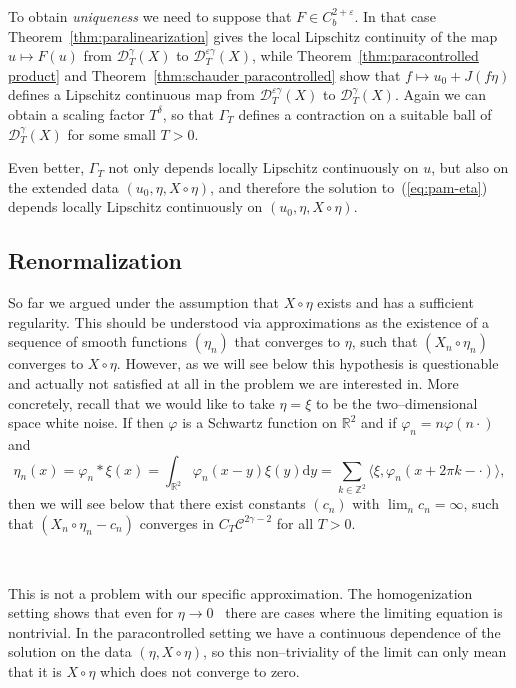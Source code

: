 \documentclass[a4paper,11pt]{article}
\newcommand{\cdummy}{\cdot}
\newcommand{\comma}{{,}}
\newcommand{\mathd}{\mathrm{d}}
\newcommand{\tmtextit}[1]{{\itshape{#1}}}
\newcommand{\CC}{\mathscr{C}}
\newcommand{\CD}{\mathscr{D}}
\newcommand{\reso}{\,\mathord{\circ}\,}
\begin{document}
To obtain \tmtextit{uniqueness} we need to suppose that $F \in C^{2 +
\varepsilon}_b$. In that case Theorem~\ref{thm:paralinearization} gives the
local Lipschitz continuity of the map $u \mapsto F (u)$ from $\CD_T^{\gamma}
(X)$ to $\CD^{\varepsilon \gamma}_T (X)$, while
Theorem~\ref{thm:paracontrolled product} and Theorem~\ref{thm:schauder
paracontrolled} show that $f \mapsto u_0 + J (f \eta)$ defines a Lipschitz
continuous map from $\CD^{\varepsilon \gamma}_T (X)$ to $\CD^{\gamma}_T (X)$.
Again we can obtain a scaling factor $T^{\delta}$, so that $\Gamma_T$ defines
a contraction on a suitable ball of $\CD^{\gamma}_T (X)$ for some small $T >
0$.

Even better, $\Gamma_T$ not only depends locally Lipschitz continuously on
$u$, but also on the extended data $(u_0, \eta \comma X \reso \eta)$, and
therefore the solution to~(\ref{eq:pam-eta}) depends locally Lipschitz
continuously on $ (u_0, \eta, X \reso \eta)$.

\subsection{Renormalization}

So far we argued under the assumption that $X \reso \eta$ exists and has a
sufficient regularity. This should be understood via approximations as the
existence of a sequence of smooth functions $(\eta_n)$ that converges to
$\eta$, such that $(X_n \reso \eta_n)$ converges to $X \reso \eta$. However, as we will see below 
this hypothesis is questionable and actually not satisfied at all in the problem we are interested in. More
concretely, recall that we would like to take $\eta = \xi$ to be the two--dimensional space white noise. If then
$\varphi$ is a Schwartz function on $\mathbb{R}^2$ and if $\varphi_n = n
\varphi (n \cdummy)$ and
\[ \eta_n (x) = \varphi_n \ast \xi (x) = \int_{\mathbb{R}^2} \varphi_n (x -
   y) \xi (y) \mathd y = \sum_{k \in \mathbb{Z}^2} \langle \xi, \varphi_n (x
   + 2 \pi k - \cdummy) \rangle, \]
then we will see below that there exist constants $(c_n)$ with $\lim_n c_n =
\infty$, such that $(X_n \reso \eta_n - c_n)$ converges in $C_T \CC^{2 \gamma
- 2}$ for all $T > 0$.

\

This is not a problem with our specific approximation. The homogenization
setting shows that even for $\eta \rightarrow 0$ \ there are cases where the
limiting equation is nontrivial. In the paracontrolled setting we have a
continuous dependence of the solution on the data $(\eta, X \reso \eta)$, so this
non--triviality of the limit can only mean that it is $X \reso \eta$ which
does not converge to zero.
\end{document}
